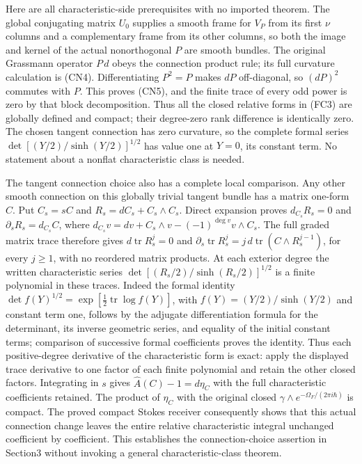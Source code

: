 \documentclass[
  11pt,
]{article}
\begin{document}
Here are all characteristic-side prerequisites with no imported theorem.
The global conjugating matrix \(U_0\) supplies a smooth frame for
\(V_P\) from its first \(\nu\) columns and a complementary frame from
its other columns, so both the image and kernel of the actual
nonorthogonal \(P\) are smooth bundles. The original Grassmann operator
\(P\,d\) obeys the connection product rule; its full curvature
calculation is (CN4). Differentiating \(P^2=P\) makes \(dP\)
off-diagonal, so \((dP)^2\) commutes with \(P\). This proves (CN5), and
the finite trace of every odd power is zero by that block decomposition.
Thus all the closed relative forms in (FC3) are globally defined and
compact; their degree-zero rank difference is identically zero. The
chosen tangent connection has zero curvature, so the complete formal
series \(\det[(Y/2)/\sinh(Y/2)]^{1/2}\) has value one at \(Y=0\), its
constant term. No statement about a nonflat characteristic class is
needed.

The tangent connection choice also has a complete local comparison. Any
other smooth connection on this globally trivial tangent bundle has a
matrix one-form \(C\). Put \(C_s=sC\) and \(R_s=dC_s+C_s\wedge C_s\).
Direct expansion proves \(d_{C_s}R_s=0\) and \(\partial_sR_s=d_{C_s}C\),
where \(d_{C_s}v=dv+C_s\wedge v-(-1)^{\deg v}v\wedge C_s\). The full
graded matrix trace therefore gives \(d\operatorname{tr}R_s^j=0\) and
\(\partial_s\operatorname{tr}R_s^j=j\,d\operatorname{tr}(C\wedge R_s^{j-1})\),
for every \(j\ge1\), with no reordered matrix products. At each exterior
degree the written characteristic series
\(\det[(R_s/2)/\sinh(R_s/2)]^{1/2}\) is a finite polynomial in these
traces. Indeed the formal identity
\(\det f(Y)^{1/2}=\exp[\tfrac12\operatorname{tr}\log f(Y)]\), with
\(f(Y)=(Y/2)/\sinh(Y/2)\) and constant term one, follows by the adjugate
differentiation formula for the determinant, its inverse geometric
series, and equality of the initial constant terms; comparison of
successive formal coefficients proves the identity. Thus each
positive-degree derivative of the characteristic form is exact: apply
the displayed trace derivative to one factor of each finite polynomial
and retain the other closed factors. Integrating in \(s\) gives
\(\hat A(C)-1=d\eta_C\) with the full characteristic coefficients
retained. The product of \(\eta_C\) with the original closed
\(\gamma\wedge e^{-\Omega_F/(2\pi i\hbar)}\) is compact. The proved
compact Stokes receiver consequently shows that this actual connection
change leaves the entire relative characteristic integral unchanged
coefficient by coefficient. This establishes the connection-choice
assertion in Section3 without invoking a general characteristic-class
theorem.
\end{document}
